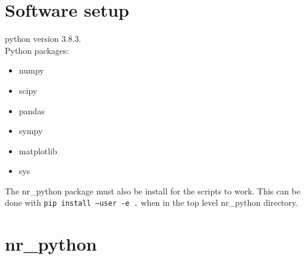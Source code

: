 \documentclass[a4paper]{article}
\begin{document}
\thispagestyle{empty}

\newpage

\tableofcontents
\newpage

\section{Software setup}%
\label{sec:software_setup}

python version 3.8.3.\\

Python packages:
\begin{itemize}
	\item numpy
	\item scipy
	\item pandas
	\item sympy
	\item matplotlib
	\item sys
\end{itemize}

The nr\_python package must also be install for the scripts to work. This can be done with
\texttt{pip install --user -e .} when in the top level nr\_python directory.

\newpage
%


\newpage
\section{nr\_python}%
\label{sec:nr_python}

\inputminted{python}{../nr_python/nr_python/__init__.py}
\end{document}
